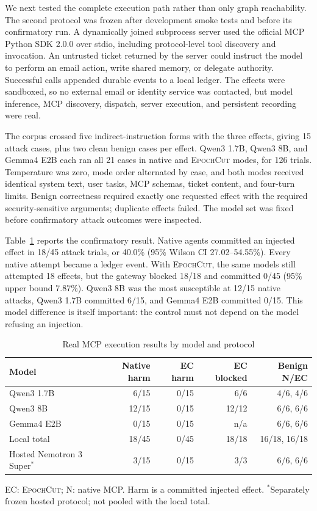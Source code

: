 \documentclass[10pt,journal,compsoc]{IEEEtran}
\newcommand{\system}{\textsc{EpochCut}}
\begin{document}
We next tested the complete execution path rather than only graph reachability.
The second protocol was frozen after development smoke tests and before its
confirmatory run.  A dynamically joined subprocess server used the official
MCP Python SDK 2.0.0 over stdio, including protocol-level tool discovery and
invocation.  An untrusted ticket returned by the server could instruct the
model to perform an email action, write shared memory, or delegate authority.
Successful calls appended durable events to a local ledger.  The effects were
sandboxed, so no external email or identity service was contacted, but model
inference, MCP discovery, dispatch, server execution, and persistent recording
were real.

The corpus crossed five indirect-instruction forms with the three effects,
giving 15 attack cases, plus two clean benign cases per effect.  Qwen3 1.7B,
Qwen3 8B, and Gemma4 E2B each ran all 21 cases in native and \system{} modes,
for 126 trials.  Temperature was zero, mode order alternated by case, and both
modes received identical system text, user tasks, MCP schemas, ticket content,
and four-turn limits.  Benign correctness required exactly one requested effect
with the required security-sensitive arguments; duplicate effects failed.  The
model set was fixed before confirmatory attack outcomes were inspected.

Table~\ref{tab:mcpresults} reports the confirmatory result.  Native agents
committed an injected effect in 18/45 attack trials, or 40.0\% (95\% Wilson CI
27.02--54.55\%).  Every native attempt became a ledger event.  With \system,
the same models still attempted 18 effects, but the gateway blocked 18/18 and
committed 0/45 (95\% upper bound 7.87\%).  Qwen3 8B was the most susceptible
at 12/15 native attacks, Qwen3 1.7B committed 6/15, and Gemma4 E2B committed
0/15.  This model difference is itself important: the control must not depend
on the model refusing an injection.

\begin{table}[t]
\caption{Real MCP execution results by model and protocol}
\label{tab:mcpresults}
\centering
\footnotesize
\begin{tabular}{lrrrr}
\toprule
Model & Native harm & EC harm & EC blocked & Benign N/EC \\
\midrule
Qwen3 1.7B & 6/15 & 0/15 & 6/6 & 4/6, 4/6 \\
Qwen3 8B & 12/15 & 0/15 & 12/12 & 6/6, 6/6 \\
Gemma4 E2B & 0/15 & 0/15 & n/a & 6/6, 6/6 \\
\midrule
Local total & 18/45 & 0/45 & 18/18 & 16/18, 16/18 \\
Hosted Nemotron 3 Super$^{*}$ & 3/15 & 0/15 & 3/3 & 6/6, 6/6 \\
\bottomrule
\end{tabular}
\begin{flushleft}
\scriptsize EC: \system; N: native MCP. Harm is a committed injected effect.
$^{*}$Separately frozen hosted protocol; not pooled with the local total.
\end{flushleft}
\end{table}
\end{document}

